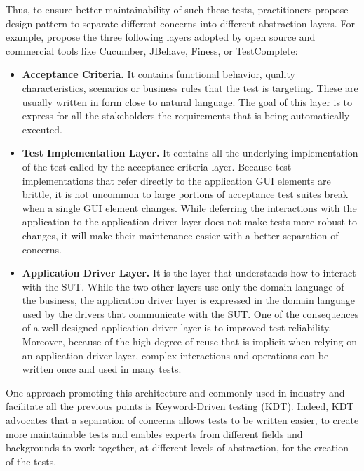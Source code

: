 Thus, to ensure better maintainability of such these tests, practitioners propose design pattern to separate different concerns into different abstraction layers. For example, \textcite{Humble2010} propose the three following layers adopted by open source and commercial tools like Cucumber, JBehave, Finess, or TestComplete:

\begin{itemize}
    \item \textbf{Acceptance Criteria.} It contains functional behavior, quality characteristics, scenarios or business rules that the test is targeting. These are usually written in form close to natural language. The goal of this layer is to express for all the stakeholders the requirements that is being automatically executed.
    
    \item \textbf{Test Implementation Layer.} It contains all the underlying implementation of the test called by the acceptance criteria layer. Because test implementations that refer directly to the application GUI elements are brittle, it is not uncommon to large portions of acceptance test suites break when a single GUI element changes. While deferring the interactions with the application to the application driver layer does not make tests more robust to changes, it will make their maintenance easier with a better separation of concerns.
    
    \item \textbf{Application Driver Layer.} It is the layer that understands how to interact with the SUT. While the two other layers use only the domain language of the business, the application driver layer is expressed in the domain language used by the drivers that communicate with the SUT. One of the consequences of a well-designed application driver layer is to improved test reliability. Moreover, because of the high degree of reuse that is implicit when relying on an application driver layer, complex interactions and operations can be written once and used in many tests.

\end{itemize}

One approach promoting this architecture and commonly used in industry and facilitate all the previous points is Keyword-Driven testing (KDT). Indeed, KDT advocates that a separation of concerns allows tests to be written easier, to create more maintainable tests and enables experts from different fields and backgrounds to work together, at different levels of abstraction, for the creation of the tests.

